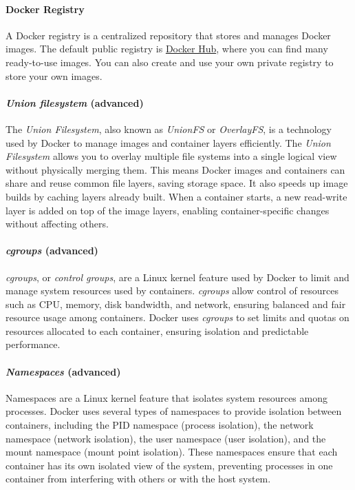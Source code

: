 \documentclass[french]{article}
\begin{document}
\paragraph{Docker Registry}
A Docker registry is a centralized repository that stores and manages Docker images.
The default public registry is \href{https://hub.docker.com/}{Docker Hub}, where you can find many ready-to-use images.
You can also create and use your own private registry to store your own images.

\paragraph{\textit{Union filesystem} (advanced)}
The \textit{Union Filesystem}, also known as \textit{UnionFS} or \textit{OverlayFS}, is a technology used by Docker to manage images and container layers efficiently.
The \textit{Union Filesystem} allows you to overlay multiple file systems into a single logical view without physically merging them.
This means Docker images and containers can share and reuse common file layers, saving storage space.
It also speeds up image builds by caching layers already built.
When a container starts, a new read-write layer is added on top of the image layers, enabling container-specific changes without affecting others.

\paragraph{\textit{cgroups} (advanced)}
\textit{cgroups}, or \textit{control groups}, are a Linux kernel feature used by Docker to limit and manage system resources used by containers.
\textit{cgroups} allow control of resources such as CPU, memory, disk bandwidth, and network, ensuring balanced and fair resource usage among containers.
Docker uses \textit{cgroups} to set limits and quotas on resources allocated to each container, ensuring isolation and predictable performance.

\paragraph{\textit{Namespaces} (advanced)}
Namespaces are a Linux kernel feature that isolates system resources among processes.
Docker uses several types of namespaces to provide isolation between containers, including the PID namespace (process isolation), the network namespace (network isolation), the user namespace (user isolation), and the mount namespace (mount point isolation).
These namespaces ensure that each container has its own isolated view of the system, preventing processes in one container from interfering with others or with the host system.
\end{document}
